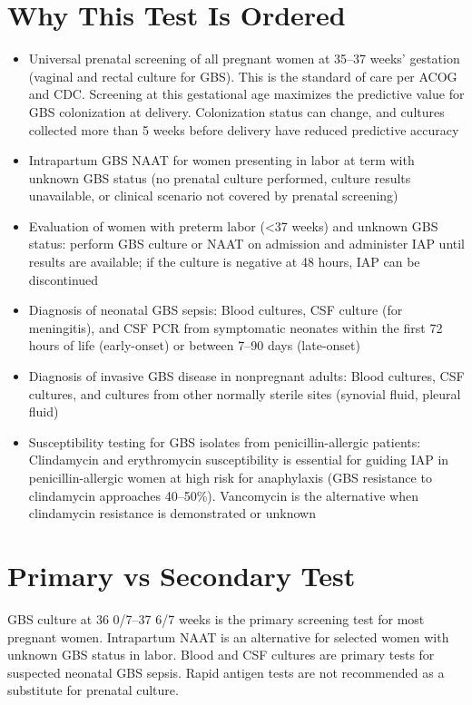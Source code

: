 \section*{Why This Test Is Ordered}
\begin{itemize}
  \item Universal prenatal screening of all pregnant women at 35--37 weeks' gestation (vaginal and rectal culture for GBS). This is the standard of care per ACOG and CDC. Screening at this gestational age maximizes the predictive value for GBS colonization at delivery. Colonization status can change, and cultures collected more than 5 weeks before delivery have reduced predictive accuracy
  \item Intrapartum GBS NAAT for women presenting in labor at term with unknown GBS status (no prenatal culture performed, culture results unavailable, or clinical scenario not covered by prenatal screening)
  \item Evaluation of women with preterm labor (<37 weeks) and unknown GBS status: perform GBS culture or NAAT on admission and administer IAP until results are available; if the culture is negative at 48 hours, IAP can be discontinued
  \item Diagnosis of neonatal GBS sepsis: Blood cultures, CSF culture (for meningitis), and CSF PCR from symptomatic neonates within the first 72 hours of life (early-onset) or between 7--90 days (late-onset)
  \item Diagnosis of invasive GBS disease in nonpregnant adults: Blood cultures, CSF cultures, and cultures from other normally sterile sites (synovial fluid, pleural fluid)
  \item Susceptibility testing for GBS isolates from penicillin-allergic patients: Clindamycin and erythromycin susceptibility is essential for guiding IAP in penicillin-allergic women at high risk for anaphylaxis (GBS resistance to clindamycin approaches 40--50\%). Vancomycin is the alternative when clindamycin resistance is demonstrated or unknown
\end{itemize}

\section*{Primary vs Secondary Test}
GBS culture at 36 0/7--37 6/7 weeks is the primary screening test for most pregnant women. Intrapartum NAAT is an alternative for selected women with unknown GBS status in labor. Blood and CSF cultures are primary tests for suspected neonatal GBS sepsis. Rapid antigen tests are not recommended as a substitute for prenatal culture.

